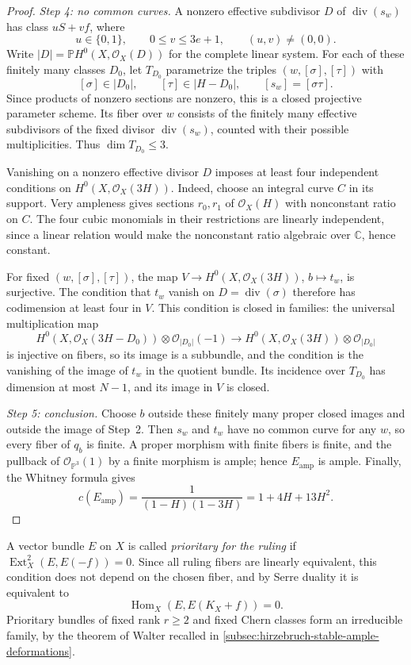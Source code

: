 \begin{proof}
\emph{Step 4: no common curves.} A nonzero effective subdivisor $D$ of $\operatorname{div}(s_w)$ has class $uS+vf$, where
\[
 u\in\{0,1\},\qquad 0\leq v\leq3e+1,
 \qquad (u,v)\neq(0,0).
\]
Write $|D|=\mathbb P H^0(X,\mathcal O_X(D))$ for the complete linear system. For each of these finitely many classes $D_0$, let $T_{D_0}$ parametrize the triples $(w,[\sigma],[\tau])$ with
\[
 [\sigma]\in|D_0|,\qquad [\tau]\in|H-D_0|,
 \qquad [s_w]=[\sigma\tau].
\]
Since products of nonzero sections are nonzero, this is a closed projective parameter scheme. Its fiber over $w$ consists of the finitely many effective subdivisors of the fixed divisor $\operatorname{div}(s_w)$, counted with their possible multiplicities. Thus $\dim T_{D_0}\leq3$.

Vanishing on a nonzero effective divisor $D$ imposes at least four independent conditions on $H^0(X,\mathcal O_X(3H))$. Indeed, choose an integral curve $C$ in its support. Very ampleness gives sections $r_0,r_1$ of $\mathcal O_X(H)$ with nonconstant ratio on $C$. The four cubic monomials in their restrictions are linearly independent, since a linear relation would make the nonconstant ratio algebraic over $\mathbb C$, hence constant.

For fixed $(w,[\sigma],[\tau])$, the map $V\to H^0(X,\mathcal O_X(3H))$, $b\mapsto t_w$, is surjective. The condition that $t_w$ vanish on $D=\operatorname{div}(\sigma)$ therefore has codimension at least four in $V$. This condition is closed in families: the universal multiplication map
\[
 H^0(X,\mathcal O_X(3H-D_0))\otimes\mathcal O_{|D_0|}(-1)
 \longrightarrow H^0(X,\mathcal O_X(3H))\otimes\mathcal O_{|D_0|}
\]
is injective on fibers, so its image is a subbundle, and the condition is the vanishing of the image of $t_w$ in the quotient bundle. Its incidence over $T_{D_0}$ has dimension at most $N-1$, and its image in $V$ is closed.

\emph{Step 5: conclusion.} Choose $b$ outside these finitely many proper closed images and outside the image of Step~2. Then $s_w$ and $t_w$ have no common curve for any $w$, so every fiber of $q_b$ is finite. A proper morphism with finite fibers is finite, and the pullback of $\mathcal O_{\mathbb P^3}(1)$ by a finite morphism is ample; hence $E_{\mathrm{amp}}$ is ample. Finally, the Whitney formula gives
\[
 c(E_{\mathrm{amp}})=\frac1{(1-H)(1-3H)}=1+4H+13H^2.
\]
\end{proof}

A vector bundle $E$ on $X$ is called \emph{prioritary for the ruling} if $\operatorname{Ext}^2_X(E,E(-f))=0$. Since all ruling fibers are linearly equivalent, this condition does not depend on the chosen fiber, and by Serre duality it is equivalent to
\[
 \operatorname{Hom}_X(E,E(K_X+f))=0.
\]
Prioritary bundles of fixed rank $r\geq2$ and fixed Chern classes form an irreducible family, by the theorem of Walter recalled in \cref{subsec:hirzebruch-stable-ample-deformations}.

